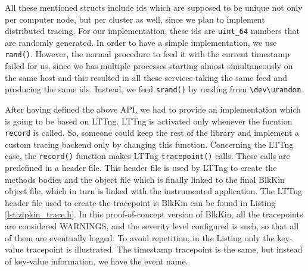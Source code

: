
All these mentioned structs include ids which are supposed to be unique not only
per computer node, but per cluster as well, since we plan to implement
distributed tracing. For our implementation, these ids are \texttt{uint\_64}
numbers that are randomly generated. In order to have a simple implementation,
we use \texttt{rand()}. However, the normal procedure to feed it with the
current timestamp failed for us, since we has multiple processes starting almost
simultaneously on the same host and this resulted in all these services taking
the same feed and producing the same ids. Instead, we feed \texttt{srand()} by
reading from \texttt{\textbackslash dev\textbackslash urandom}.

After having defined the above API, we had to provide an implementation which is
going to be based on LTTng. LTTng is activated only whenever the fucntion
\texttt{record} is called. So, someone could keep the rest of the library and
implement a custom tracing backend only by changing this function. Concerning
the LTTng case, the \texttt{record()} function makes LTTng \texttt{tracepoint()}
calls. These calls are predefined in a header file. This header file is used by
LTTng to create the methods bodies and the object file which is finally linked
to the final BlkKin object file, which in turn is linked with the instrumented
application. The LTTng header file used to create the tracepoint is BlkKin can
be found in Listing \ref{lst:zipkin_trace.h}. In this proof-of-concept version
of BlkKin, all the tracepoints are considered WARNINGS, and the severity level
configured is such, so that all of them are eventually logged. To avoid
repetition, in the Listing only the key-value tracepoint is illustrated. The
timestamp tracepoint is the same, but instead of key-value information, we have
the event name.


